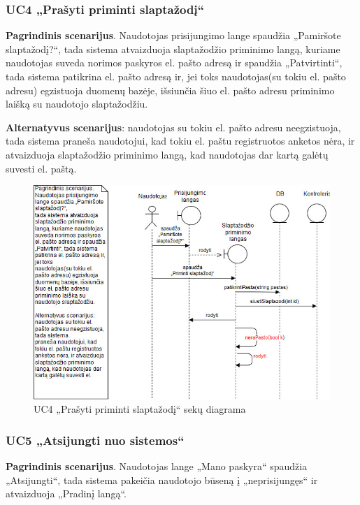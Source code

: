 \documentclass{VUMIFPSbakalaurinis}
\begin{document}
\subsubsection{UC4 „Prašyti priminti slaptažodį“}
\textbf{Pagrindinis scenarijus}. Naudotojas prisijungimo lange spaudžia „Pamiršote slaptažodį?“, tada sistema atvaizduoja slaptažodžio priminimo langą, kuriame naudotojas suveda norimos paskyros el. pašto adresą ir spaudžia „Patvirtinti“, tada sistema patikrina el. pašto adresą ir, jei toks naudotojas(su tokiu el. pašto adresu) egzistuoja duomenų bazėje, išsiunčia šiuo el. pašto adresu priminimo laišką su naudotojo slaptažodžiu. 
\par \textbf{Alternatyvus scenarijus}: naudotojas su tokiu el. pašto adresu neegzistuoja, tada sistema praneša naudotojui, kad tokiu el. paštu registruotos anketos nėra, ir atvaizduoja slaptažodžio priminimo langą, kad naudotojas dar kartą galėtų suvesti el. paštą.

\begin{figure}[H]
	\centering
	\includegraphics[scale=0.6]{img/Sequence/4sequence}
	\caption{UC4 „Prašyti priminti slaptažodį“ sekų diagrama}
	\label{img:uc4seq}
\end{figure}

\subsubsection{UC5 „Atsijungti nuo sistemos“}
\textbf{Pagrindinis scenarijus}. Naudotojas lange „Mano paskyra“ spaudžia „Atsijungti“, tada sistema pakeičia naudotojo būseną į „neprisijungęs“ ir atvaizduoja „Pradinį langą“.
\end{document}
